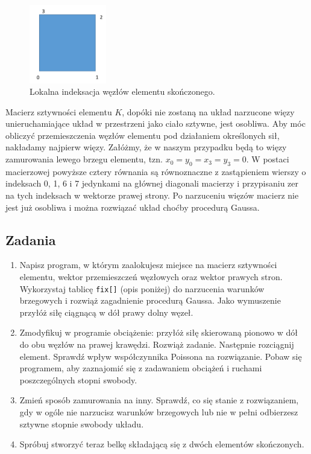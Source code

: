 \documentclass{instrukcja}
\begin{document}
\begin{figure}[h]
\centering
\includegraphics[width=0.3\textwidth]{element.png}
\caption[c]{Lokalna indeksacja węzłów elementu skończonego.}
\end{figure}

Macierz sztywności elementu $K$, dopóki nie zostaną na układ narzucone więzy unieruchamiające układ w przestrzeni jako ciało sztywne, jest osobliwa. Aby móc obliczyć przemieszczenia węzłów elementu pod działaniem określonych sił, nakładamy najpierw więzy. Załóżmy, że w naszym przypadku będą to więzy zamurowania lewego brzegu elementu, tzn. $x_0 = y_0 = x_3 = y_3 = 0$. W postaci macierzowej powyższe cztery równania są równoznaczne z zastąpieniem wierszy o indeksach 0, 1, 6 i 7 jedynkami na głównej diagonali macierzy i przypisaniu zer na tych indeksach w wektorze prawej strony. Po narzuceniu więzów macierz nie jest już osobliwa i można rozwiązać układ choćby procedurą Gaussa.

\subsection*{Zadania}
\begin{enumerate}
\item Napisz program, w którym zaalokujesz miejsce na macierz sztywności elementu, wektor przemieszczeń węzłowych oraz wektor prawych stron. Wykorzystaj tablicę {\tt fix[]} (opis poniżej) do narzucenia warunków brzegowych i rozwiąż zagadnienie procedurą Gaussa. Jako wymuszenie przyłóż siłę ciągnącą w dół prawy dolny węzeł.
\item Zmodyfikuj w programie obciążenie: przyłóż siłę skierowaną pionowo w dół do obu węzłów na prawej krawędzi. Rozwiąż zadanie. Następnie rozciągnij element. Sprawdź wpływ współczynnika Poissona na rozwiązanie. Pobaw się programem, aby zaznajomić się z zadawaniem obciążeń i ruchami poszczególnych stopni swobody.
\item Zmień sposób zamurowania na inny. Sprawdź, co się stanie z rozwiązaniem, gdy w ogóle nie narzucisz warunków brzegowych lub nie w pełni odbierzesz sztywne stopnie swobody układu.
\item Spróbuj stworzyć teraz belkę składającą się z dwóch elementów skończonych.
\end{enumerate}
\end{document}
